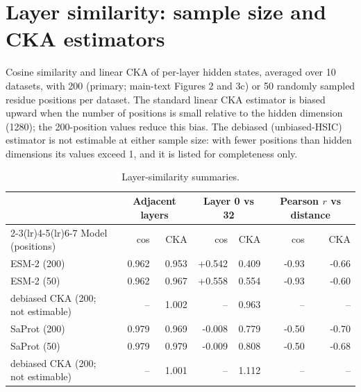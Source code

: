 \documentclass[11pt,a4paper]{article}
\begin{document}
\section*{Layer similarity: sample size and CKA estimators}
Cosine similarity and linear CKA of per-layer hidden states, averaged over 10 datasets,
with 200 (primary; main-text Figures 2 and 3c) or 50 randomly sampled residue positions
per dataset. The standard linear CKA estimator is biased upward when the number of
positions is small relative to the hidden dimension (1280); the 200-position values
reduce this bias. The debiased (unbiased-HSIC) estimator is not estimable at either
sample size: with fewer positions than hidden dimensions its values exceed 1, and it is
listed for completeness only.
\begin{table}[H]\centering\small
\caption{Layer-similarity summaries.}\label{tab:S3}
\begin{tabular}{lrrrrrr}
\toprule
& \multicolumn{2}{c}{Adjacent layers} & \multicolumn{2}{c}{Layer 0 vs 32} & \multicolumn{2}{c}{Pearson $r$ vs distance} \\
\cmidrule(lr){2-3}\cmidrule(lr){4-5}\cmidrule(lr){6-7}
Model (positions) & cos & CKA & cos & CKA & cos & CKA \\
\midrule
ESM-2 (200) & 0.962 & 0.953 & +0.542 & 0.409 & -0.93 & -0.66 \\
ESM-2 (50) & 0.962 & 0.967 & +0.558 & 0.554 & -0.93 & -0.60 \\
\quad debiased CKA (200; not estimable) & -- & 1.002 & -- & 0.963 & -- & -- \\
\midrule
SaProt (200) & 0.979 & 0.969 & -0.008 & 0.779 & -0.50 & -0.70 \\
SaProt (50) & 0.979 & 0.979 & -0.009 & 0.808 & -0.50 & -0.68 \\
\quad debiased CKA (200; not estimable) & -- & 1.001 & -- & 1.112 & -- & -- \\
\bottomrule
\end{tabular}\end{table}
\end{document}
